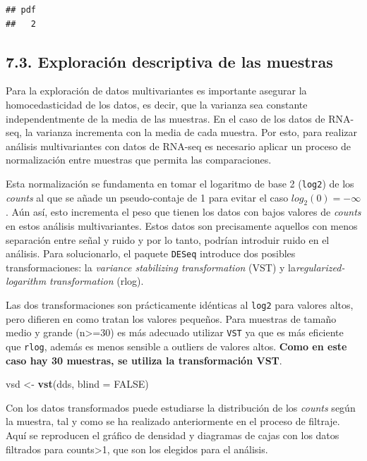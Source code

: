 \documentclass[
]{article}
\newenvironment{Shaded}{\begin{snugshade}}{\end{snugshade}}
\newcommand{\DataTypeTok}[1]{\textcolor[rgb]{0.13,0.29,0.53}{#1}}
\newcommand{\KeywordTok}[1]{\textcolor[rgb]{0.13,0.29,0.53}{\textbf{#1}}}
\newcommand{\NormalTok}[1]{#1}
\newcommand{\OtherTok}[1]{\textcolor[rgb]{0.56,0.35,0.01}{#1}}
\newcommand{\StringTok}[1]{\textcolor[rgb]{0.31,0.60,0.02}{#1}}
\begin{document}
\begin{verbatim}
## pdf 
##   2
\end{verbatim}

\hypertarget{exploraciuxf3n-descriptiva-de-las-muestras}{%
\subsection{7.3. Exploración descriptiva de las
muestras}\label{exploraciuxf3n-descriptiva-de-las-muestras}}

Para la exploración de datos multivariantes es importante asegurar la
homocedasticidad de los datos, es decir, que la varianza sea constante
independentmente de la media de las muestras. En el caso de los datos de
RNA-seq, la varianza incrementa con la media de cada muestra. Por esto,
para realizar análisis multivariantes con datos de RNA-seq es necesario
aplicar un proceso de normalización entre muestras que permita las
comparaciones.

Esta normalización se fundamenta en tomar el logaritmo de base 2
(\texttt{log2}) de los \emph{counts} al que se añade un pseudo-contaje
de 1 para evitar el caso \(log_2(0)=-\infty\). Aún así, esto incrementa
el peso que tienen los datos con bajos valores de \emph{counts} en estos
análisis multivariantes. Estos datos son precisamente aquellos con menos
separación entre señal y ruido y por lo tanto, podrían introduir ruido
en el análisis. Para solucionarlo, el paquete \texttt{DESeq} introduce
dos posibles transformaciones: la \emph{variance stabilizing
transformation} (VST) y la\emph{regularized-logarithm transformation}
(rlog).

Las dos transformaciones son prácticamente idénticas al \texttt{log2}
para valores altos, pero difieren en como tratan los valores pequeños.
Para muestras de tamaño medio y grande (n\textgreater=30) es más
adecuado utilizar \texttt{VST} ya que es más eficiente que
\texttt{rlog}, además es menos sensible a outliers de valores altos.
\textbf{Como en este caso hay 30 muestras, se utiliza la transformación
VST}.

\begin{Shaded}
\begin{Highlighting}[]
\NormalTok{vsd <-}\StringTok{ }\KeywordTok{vst}\NormalTok{(dds, }\DataTypeTok{blind =} \OtherTok{FALSE}\NormalTok{)}
\end{Highlighting}
\end{Shaded}

Con los datos transformados puede estudiarse la distribución de los
\emph{counts} según la muestra, tal y como se ha realizado anteriormente
en el proceso de filtraje. Aquí se reproducen el gráfico de densidad y
diagramas de cajas con los datos filtrados para counts\textgreater1, que
son los elegidos para el análisis.
\end{document}
